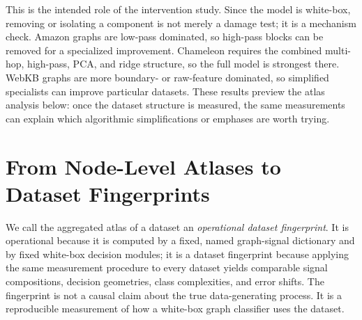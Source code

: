 \documentclass{article}
\begin{document}
This is the intended role of the intervention study. Since the model is
white-box, removing or isolating a component is not merely a damage test; it is
a mechanism check. Amazon graphs are low-pass dominated, so high-pass blocks
can be removed for a specialized improvement. Chameleon requires the combined
multi-hop, high-pass, PCA, and ridge structure, so the full model is strongest
there. WebKB graphs are more boundary- or raw-feature dominated, so simplified
specialists can improve particular datasets. These results preview the atlas
analysis below: once the dataset structure is measured, the same measurements
can explain which algorithmic simplifications or emphases are worth trying.

\section{From Node-Level Atlases to Dataset Fingerprints}
\label{sec:mechanistic-atlas}

We call the aggregated atlas of a dataset an \emph{operational dataset
fingerprint}. It is operational because it is computed by a fixed, named
graph-signal dictionary and by fixed white-box decision modules; it is a
dataset fingerprint because applying the same measurement procedure to every
dataset yields comparable signal compositions, decision geometries, class
complexities, and error shifts. The fingerprint is not a causal claim about
the true data-generating process. It is a reproducible measurement of how a
white-box graph classifier uses the dataset.
\end{document}
